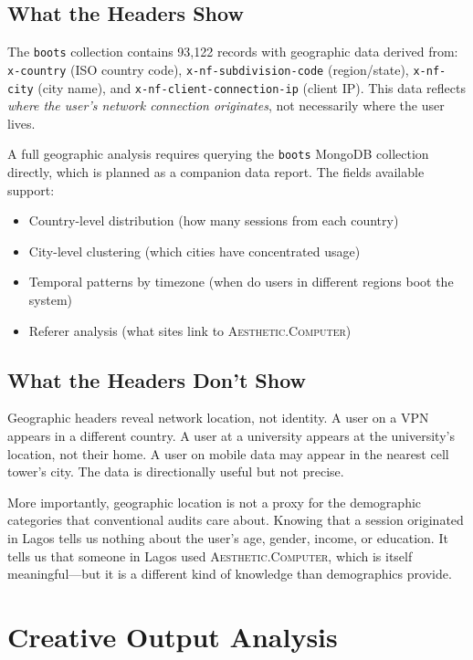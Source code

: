 \documentclass[10pt,letterpaper,twocolumn]{article}
\newcommand{\ac}{\textsc{Aesthetic.Computer}}
\begin{document}
\subsection{What the Headers Show}

The \texttt{boots} collection contains 93,122 records with geographic data derived from: \texttt{x-country} (ISO country code), \texttt{x-nf-subdivision-code} (region/state), \texttt{x-nf-city} (city name), and \texttt{x-nf-client-connection-ip} (client IP). This data reflects \emph{where the user's network connection originates}, not necessarily where the user lives.

A full geographic analysis requires querying the \texttt{boots} MongoDB collection directly, which is planned as a companion data report. The fields available support:

\begin{itemize}
  \item Country-level distribution (how many sessions from each country)
  \item City-level clustering (which cities have concentrated usage)
  \item Temporal patterns by timezone (when do users in different regions boot the system)
  \item Referer analysis (what sites link to \ac{})
\end{itemize}

\subsection{What the Headers Don't Show}

Geographic headers reveal network location, not identity. A user on a VPN appears in a different country. A user at a university appears at the university's location, not their home. A user on mobile data may appear in the nearest cell tower's city. The data is directionally useful but not precise.

More importantly, geographic location is not a proxy for the demographic categories that conventional audits care about. Knowing that a session originated in Lagos tells us nothing about the user's age, gender, income, or education. It tells us that someone in Lagos used \ac{}, which is itself meaningful---but it is a different kind of knowledge than demographics provide.

\section{Creative Output Analysis}
\end{document}
